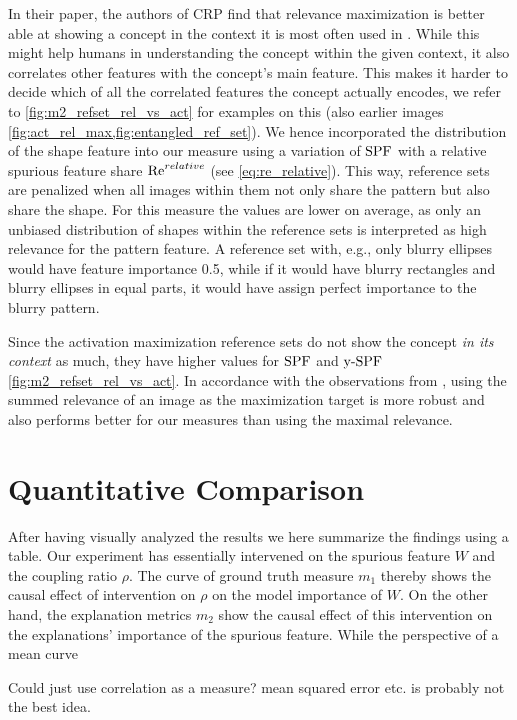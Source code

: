 In their paper, the authors of CRP find that relevance maximization is better able at showing a concept in the context it is most often used in \citep{Achtibat2022}.
While this might help humans in understanding the concept within the given context, it also correlates other features with the concept's main feature. This makes it harder to decide which of all the correlated features the concept actually encodes, we refer to \cref{fig:m2_refset_rel_vs_act} for examples on this (also earlier images \cref{fig:act_rel_max,fig:entangled_ref_set}).
We hence incorporated the distribution of the shape feature into our measure using a variation of $\operatorname*{SPF}$ with a relative spurious feature share $\operatorname*{Re}^{relative}$ (see \cref{eq:re_relative}).
This way, reference sets are penalized when all images within them not only share the pattern but also share the shape. 
For this measure the values are lower on average, as only an unbiased distribution of shapes within the reference sets is interpreted as high relevance for the pattern feature. A reference set with, e.g., only blurry ellipses would have feature importance 0.5, while if it would have blurry rectangles and blurry ellipses in equal parts, it would have assign perfect importance to the blurry pattern. 

Since the activation maximization reference sets do not show the concept \textit{in its context} as much, they have higher values for $\operatorname*{SPF}$ and $\operatorname*{y-SPF}$ \cref{fig:m2_refset_rel_vs_act}. 
In accordance with the observations from \cite{Achtibat2022}, using the summed relevance of an image as the maximization target is more robust and also performs better for our measures than using the maximal relevance. 

\section{Quantitative Comparison}
After having visually analyzed the results we here summarize the findings using a table. Our experiment has essentially intervened on the spurious feature $W$ and the coupling ratio $\rho$. The curve of ground truth measure $m_1$ thereby shows the causal effect of intervention on $\rho$ on the model importance of $W$. On the other hand, the explanation metrics $m_2$ show the causal effect of this intervention on the explanations' importance of the spurious feature. 
While the perspective of a mean curve 

Could just use correlation as a measure? mean squared error etc. is probably not the best idea.

